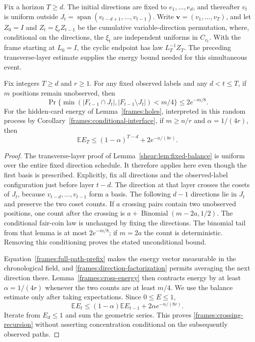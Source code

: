 Fix a horizon $T\ge d$. The initial directions are fixed to $e_1,\ldots,e_d$, and thereafter
$v_t$ is uniform outside $J_t=\operatorname{span}(v_{t-d+1},\ldots,v_{t-1})$.
Write $\mathbf v=(v_1,\ldots,v_T)$, and let $Z_0=I$ and
$Z_t=\xi_t Z_{t-1}$ be the cumulative
variable-direction permutation, where, conditional on the directions,
the $\xi_t$ are independent uniforms in $C_{v_t}$. With the frame
starting at $L_0=I$, the cyclic endpoint has law $L_T^{-1}Z_T$.
The preceding transverse-layer estimate supplies the energy bound
needed for this simultaneous event.

\begin{lemma}
\label{frames:crossing-balance}
Fix integers $T\ge d$ and $r\ge1$. For any fixed observed labels and
any $d<t\le T$, if $m$ positions remain unobserved, then
\[
 \Pr\{\min(|F_{t-1}\cap J_t|,|F_{t-1}\setminus J_t|)<m/4\}
 \le2e^{-m/8}.
\]
For the hidden-card energy of Lemma~\ref{frames:holes}, interpreted in
this random process by Corollary~\ref{frames:conditional-interface},
if $m\ge n/r$ and $\alpha=1/(4r)$, then
\begin{equation}
 \mathbb E E_T\le(1-\alpha)^{T-d}+2e^{-n/(8r)}.
 \label{frames:crossing-recursion}
\end{equation}
\end{lemma}

\begin{proof}
The transverse-layer proof of Lemma~\ref{shear:lem:fixed-balance}
is uniform over the entire fixed direction schedule. It therefore
applies here even though the first basis is prescribed. Explicitly,
fix all directions and the observed-label configuration just before
layer $t-d$.
The direction at that layer crosses the cosets of $J_t$, because
$v_{t-d},\ldots,v_{t-1}$ form a basis. The following $d-1$ directions
lie in $J_t$ and preserve the two coset counts. If $a$ crossing pairs
contain two unobserved positions, one count after the crossing is
$a+\operatorname{Binomial}(m-2a,1/2)$. The conditional fair-coin law
is unchanged by fixing the directions. The binomial tail from that
lemma is at most $2e^{-m/8}$; if $m=2a$ the count is deterministic.
Removing this conditioning proves the stated unconditional bound.

Equation~\eqref{frames:full-path-prefix} makes the energy vector
measurable in the chronological field, and
\eqref{frames:direction-factorization} permits averaging the next
direction there. Lemma~\ref{frames:cross-energy} then contracts
energy by at least $\alpha=1/(4r)$ whenever the two counts are at
least $m/4$. We use the balance estimate only after taking
expectations. Since $0\le E\le1$,
\[
 \mathbb E E_t\le(1-\alpha)\mathbb E E_{t-1}
                    +2\alpha e^{-n/(8r)}.
\]
Iterate from $E_d\le1$ and sum the geometric series. This proves
\eqref{frames:crossing-recursion} without asserting concentration
conditional on the subsequently observed paths.
\end{proof}

